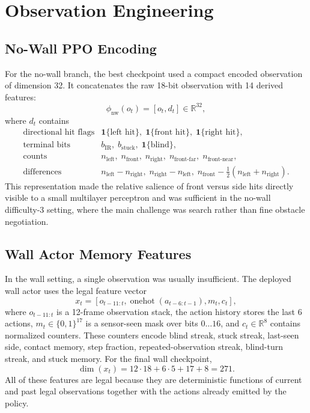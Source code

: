 \documentclass[11pt]{article}
\begin{document}
\section{Observation Engineering}

\subsection{No-Wall PPO Encoding}

For the no-wall branch, the best checkpoint used a compact encoded observation of
dimension 32. It concatenates the raw 18-bit observation with 14 derived features:
\[
  \phi_{\text{nw}}(o_t)=[o_t,d_t]\in\mathbb{R}^{32},
\]
where \(d_t\) contains
\[
\begin{array}{ll}
\text{directional hit flags} & \mathbf{1}\{\text{left hit}\},\; \mathbf{1}\{\text{front hit}\},\; \mathbf{1}\{\text{right hit}\},\\
\text{terminal bits} & b_{\text{IR}},\; b_{\text{stuck}},\; \mathbf{1}\{\text{blind}\},\\
\text{counts} & n_{\text{left}},\; n_{\text{front}},\; n_{\text{right}},\; n_{\text{front-far}},\; n_{\text{front-near}},\\
\text{differences} & n_{\text{left}}-n_{\text{right}},\; n_{\text{right}}-n_{\text{left}},\;
  n_{\text{front}}-\frac{1}{2}(n_{\text{left}}+n_{\text{right}}).
\end{array}
\]
This representation made the relative salience of front versus side hits directly visible
to a small multilayer perceptron and was sufficient in the no-wall difficulty-3 setting,
where the main challenge was search rather than fine obstacle negotiation.

\subsection{Wall Actor Memory Features}

In the wall setting, a single observation was usually insufficient. The deployed wall
actor uses the legal feature vector
\[
  x_t=
  [
    o_{t-11:t},
    \operatorname{onehot}(a_{t-6:t-1}),
    m_t,
    c_t
  ],
\]
where \(o_{t-11:t}\) is a 12-frame observation stack, the action history stores the last 6
actions, \(m_t\in\{0,1\}^{17}\) is a sensor-seen mask over bits \(0\ldots16\), and
\(c_t\in\mathbb{R}^8\) contains normalized counters. These counters encode blind streak,
stuck streak, last-seen side, contact memory, step fraction, repeated-observation
streak, blind-turn streak, and stuck memory.
For the final wall checkpoint,
\[
  \dim(x_t)=12\cdot18 + 6\cdot5 + 17 + 8 = 271.
\]
All of these features are legal because they are deterministic functions of current and
past legal observations together with the actions already emitted by the policy.
\end{document}
